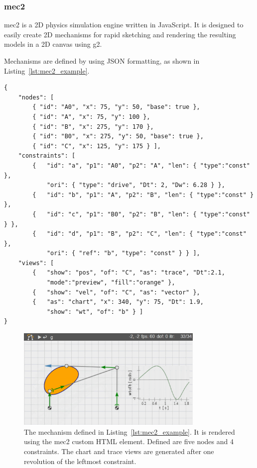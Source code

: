 \subsubsection{mec2}

mec2 is a 2D physics simulation engine written in JavaScript.
It is designed to easily create 2D mechanisms for rapid sketching and rendering the resulting models in a 2D canvas using g2.

Mechanisms are defined by using JSON formatting, as shown in Listing~\ref{lst:mec2_example}.

\begin{lstlisting}[label={lst:mec2_example}, caption={ Example for a mechanism defined in the syntax proposed by \name{mec2}. }]
{
    "nodes": [
        { "id": "A0", "x": 75, "y": 50, "base": true },
        { "id": "A", "x": 75, "y": 100 },
        { "id": "B", "x": 275, "y": 170 },
        { "id": "B0", "x": 275, "y": 50, "base": true },
        { "id": "C", "x": 125, "y": 175 } ],
    "constraints": [
        {   "id": "a", "p1": "A0", "p2": "A", "len": { "type":"const" },
            "ori": { "type": "drive", "Dt": 2, "Dw": 6.28 } },
        {   "id": "b", "p1": "A", "p2": "B", "len": { "type":"const" } },
        {   "id": "c", "p1": "B0", "p2": "B", "len": { "type":"const" } },
        {   "id": "d", "p1": "B", "p2": "C", "len": { "type":"const" },
            "ori": { "ref": "b", "type": "const" } } ],
    "views": [
        {   "show": "pos", "of": "C", "as": "trace", "Dt":2.1,
            "mode":"preview", "fill":"orange" },
        {   "show": "vel", "of": "C", "as": "vector" },
        {   "as": "chart", "x": 340, "y": 75, "Dt": 1.9,
            "show": "wt", "of": "b" } ]
}
\end{lstlisting}

\begin{figure}
    \centering
    \includegraphics[width=0.8\textwidth]{images/mec2_chart.png}
    \caption[Example of the mec2 HTML element]{ The mechanism defined in Listing~\ref{lst:mec2_example}. It is rendered using the mec2 custom HTML element. Defined are five nodes and 4 constraints. The chart and trace views are generated after one revolution of the leftmost constraint. }\label{fig:generated_data_samples}
\end{figure}

